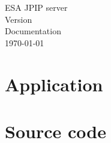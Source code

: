 \documentclass[a4paper]{book}
\begin{document}
\hypersetup{pageanchor=false}

\begin{titlepage}
\vspace*{7cm}
\begin{center}
{\Huge ESA JPIP server}\\
{\large Version }\\
\vspace*{1cm}
{\Large Documentation}\\
\vspace*{0.5cm}
{\today}\\
\end{center}
\end{titlepage}

\clearemptydoublepage
{}
\tableofcontents

\clearemptydoublepage
{}

\hypersetup{pageanchor=true}

\part{Application}


\part{Source code}
\label{sourcecode}
\end{document}
